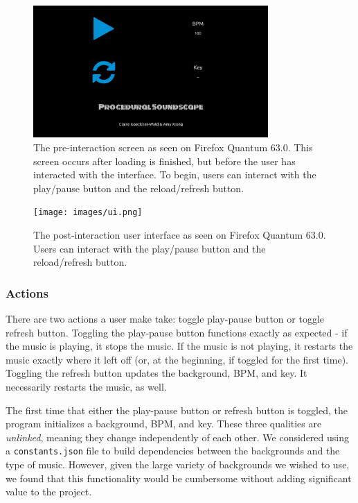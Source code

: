 \documentclass[12pt,a4paper]{article}
\newcommand{\lightcode}[1]{\colorbox{light-gray}{\texttt{#1}}}
\begin{document}
\begin{figure}
\centering\includegraphics[width=0.8\textwidth]{images/loaded.png}
\caption{The pre-interaction screen as seen on Firefox Quantum 63.0. This screen occurs after loading is finished, but before the user has interacted with the interface. To begin, users can interact with the play/pause button and the reload/refresh button.}
\end{figure}

\begin{figure}
\centering\texttt{[image: images/ui.png]}
\caption{The post-interaction user interface as seen on Firefox Quantum 63.0. Users can interact with the play/pause button and the reload/refresh button.}
\end{figure}

\subsubsection{Actions}

There are two actions a user make take: toggle play-pause button or toggle refresh button. Toggling the play-pause button functions exactly as expected - if the music is playing, it stops the music. If the music is not playing, it restarts the music exactly where it left off (or, at the beginning, if toggled for the first time). Toggling the refresh button updates the background, BPM, and key. It necessarily restarts the music, as well.

The first time that either the play-pause button or refresh button is toggled, the program initializes a background, BPM, and key. These three qualities are \textit{unlinked}, meaning they change independently of each other. We considered using a \lightcode{constants.json} file to build dependencies between the backgrounds and the type of music. However, given the large variety of backgrounds we wished to use, we found that this functionality would be cumbersome without adding significant value to the project.
\end{document}
